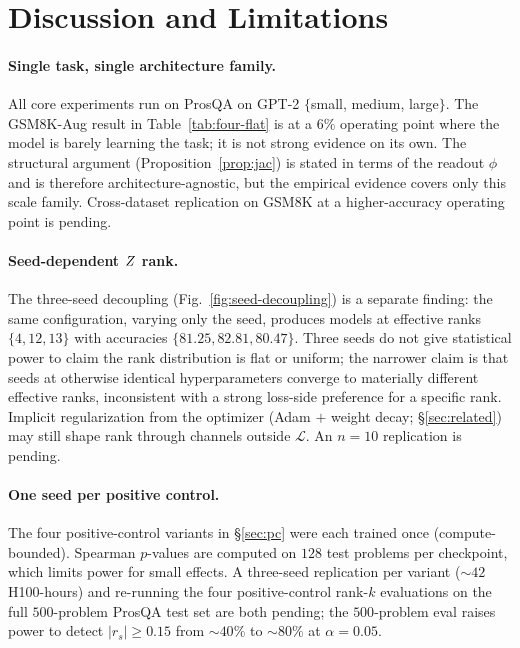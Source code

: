 \section{Discussion and Limitations}
\label{sec:discussion}

\paragraph{Single task, single architecture family.} All core
experiments run on ProsQA \citep{hao2024coconut} on GPT-2
$\{$small, medium, large$\}$. The GSM8K-Aug result in
Table~\ref{tab:four-flat} is at a $6\%$ operating point where the
model is barely learning the task; it is not strong evidence on
its own. The structural argument
(Proposition~\ref{prop:jac}) is stated in terms of the readout
$\phi$ and is therefore architecture-agnostic, but the empirical
evidence covers only this scale family. Cross-dataset replication
on GSM8K at a higher-accuracy operating point is pending.

\paragraph{Seed-dependent $Z$ rank.} The three-seed decoupling
(Fig.~\ref{fig:seed-decoupling}) is a separate finding: the same
configuration, varying only the seed, produces models at effective
ranks $\{4, 12, 13\}$ with accuracies $\{81.25, 82.81, 80.47\}$.
Three seeds do not give statistical power to claim the rank
distribution is flat or uniform; the narrower claim is that seeds
at otherwise identical hyperparameters converge to materially
different effective ranks, inconsistent with a strong loss-side
preference for a specific rank. Implicit regularization from the
optimizer (Adam $+$ weight decay; \S\ref{sec:related}) may still
shape rank through channels outside $\mathcal{L}$. An $n\!=\!10$
replication is pending.

\paragraph{One seed per positive control.} The four
positive-control variants in \S\ref{sec:pc} were each trained once
(compute-bounded). Spearman $p$-values are computed on $128$ test
problems per checkpoint, which limits power for small effects. A
three-seed replication per variant ($\sim\!42$ H100-hours) and
re-running the four positive-control rank-$k$ evaluations on the
full $500$-problem ProsQA test set are both pending; the
$500$-problem eval raises power to detect $|r_s|\!\geq\!0.15$ from
$\sim\!40\%$ to $\sim\!80\%$ at $\alpha\!=\!0.05$.

